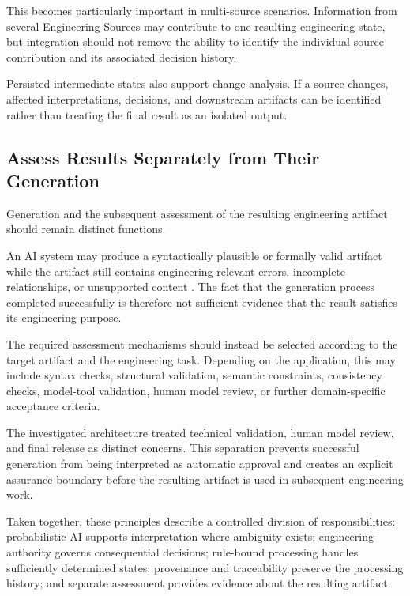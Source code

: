 This becomes particularly important in multi-source scenarios. Information from several
Engineering Sources may contribute to one resulting engineering state, but integration
should not remove the ability to identify the individual source contribution and its
associated decision history.

Persisted intermediate states also support change analysis. If a source changes, affected
interpretations, decisions, and downstream artifacts can be identified rather than treating
the final result as an isolated output.

\subsection{Assess Results Separately from Their Generation}
\label{sec:principle_verification}

Generation and the subsequent assessment of the resulting engineering artifact should
remain distinct functions.

An AI system may produce a syntactically plausible or formally valid artifact while the
artifact still contains engineering-relevant errors, incomplete relationships, or unsupported
content \cite{Topcu2025,Cibrian.2025,Stein2026}. The fact that the generation process
completed successfully is therefore not sufficient evidence that the result satisfies its
engineering purpose.

The required assessment mechanisms should instead be selected according to the target
artifact and the engineering task. Depending on the application, this may include syntax
checks, structural validation, semantic constraints, consistency checks, model-tool
validation, human model review, or further domain-specific acceptance criteria.

The investigated architecture treated technical validation, human model review, and final release
as distinct concerns. This separation prevents successful generation from being interpreted
as automatic approval and creates an explicit assurance boundary before the resulting
artifact is used in subsequent engineering work.

Taken together, these principles describe a controlled division of responsibilities:
probabilistic AI supports interpretation where ambiguity exists; engineering authority
governs consequential decisions; rule-bound processing handles sufficiently determined
states; provenance and traceability preserve the processing history; and separate
assessment provides evidence about the resulting artifact.
